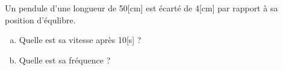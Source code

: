 \begin{exercise}
    Un pendule d'une longueur de 50[cm] est écarté de 4[cm] par rapport à sa position d'équlibre.
    \begin{enumerate}[a)]
        \item Quelle est sa vitesse après 10[s] ?
        \item Quelle est sa fréquence ?
    \end{enumerate}
\end{exercise}


\begin{minipage}{.5\textwidth}
    \begin{exercise}
    \end{exercise}
\end{minipage}
\begin{minipage}{.5\textwidth}
    \begin{exercise}
    \end{exercise}
\end{minipage}



